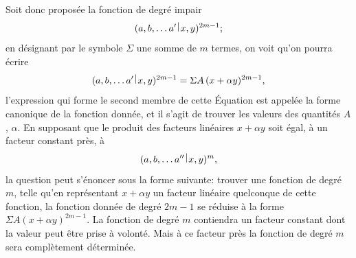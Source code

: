 \documentclass[11pt,a4paper]{book}
\theoremstyle{plain}
\newcommand{\wrule}{\hspace{-0.1em}\mid\hspace{-0.1em}}
\begin{document}
Soit donc propos\'{e}e la fonction de degr\'{e} impair
\[
(a,b,\ldots a'\,\raisebox{0.5ex}{$\wrule$}\,x,y)^{2m-1};
\]
en d\'{e}signant par le symbole $\Sigma$ une somme de $m$ termes, on voit qu'on pourra \'{e}crire
\[
(a,b,\ldots a'\,\raisebox{0.5ex}{$\wrule$}\,x,y)^{2m-1}=\Sigma A\,(x+\alpha y)^{2m-1},
\]
l'expression qui forme le second membre de cette \'{E}quation est appel\'{e}e la forme canonique de la fonction donn\'{e}e, et il s'agit de trouver les valeurs des quantit\'{e}s $A$, $\alpha$. En supposant que le produit des facteurs lin\'{e}aires $x+\alpha y$ soit \'{e}gal, \`{a} un facteur constant pr\`{e}s, \`{a}
\[
(a,b,\ldots a''\,\raisebox{0.5ex}{$\wrule$}\,x,y)^m,
\]
la question peut s'\'{e}noncer sous la forme suivante: trouver une fonction de degr\'{e} $m$, telle qu'en repr\'{e}sentant $x+\alpha y$ un facteur lin\'{e}aire quelconque de cette fonction, la fonction donn\'{e}e de degr\'{e} $2m-1$ se r\'{e}duise \`{a} la forme $\Sigma A(x+\alpha y)^{2m-1}$. La fonction de degr\'{e} $m$ contiendra un facteur constant dont la valeur peut \^{e}tre prise \`{a} volont\'{e}. Mais \`{a} ce facteur pr\`{e}s la fonction de degr\'{e} $m$ sera compl\`{e}tement d\'{e}termin\'{e}e.
\end{document}
